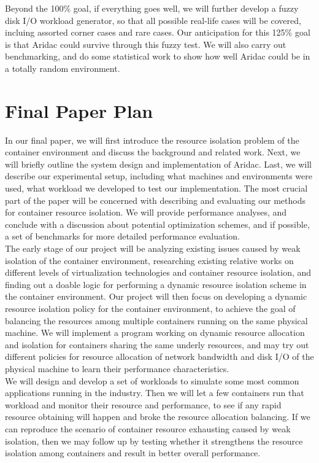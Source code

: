 \documentclass[10pt, conference,compsoc]{IEEEtran}
\begin{document}
Beyond the 100\% goal, if everything goes well, we will further develop a fuzzy disk I/O workload generator, so that all possible real-life cases will be covered, incluing assorted corner cases and rare cases. Our anticipation for this 125\% goal is that Aridac could survive through this fuzzy test. We will also carry out benchmarking, and do some statistical work to show how well Aridac could be in a totally random environment.




\section{Final Paper Plan}
In our final paper, we will first introduce the resource isolation problem of the container environment and discuss the background and related work. Next, we will briefly outline the system design and implementation of Aridac. Last, we will describe our experimental setup, including what machines and environments were used, what workload we developed to test our implementation. The most crucial part of the paper will be concerned with describing and evaluating our methods for container resource isolation. We will provide performance analyses, and conclude with a discussion about potential optimization schemes, and if possible, a set of benchmarks for more detailed performance evaluation.\\

The early stage of our project will be analyzing existing issues caused by weak isolation of the container environment, researching existing relative works on different levels of virtualization technologies and container resource isolation, and finding out a doable logic for performing a dynamic resource isolation scheme in the container environment. Our project will then focus on developing a dynamic resource isolation policy for the container environment, to achieve the goal of balancing the resources among multiple containers running on the same physical machine. We will implement a program working on dynamic resource allocation and isolation for containers sharing the same underly resources, and may try out different policies for resource allocation of network bandwidth and disk I/O of the physical machine to learn their performance characteristics.\\

We will design and develop a set of workloads to simulate some most common applications running in the industry. Then we will let a few containers run that workload and monitor their resource and performance, to see if any rapid resource obtaining will happen and broke the resource allocation balancing. If we can reproduce the scenario of container resource exhausting caused by weak isolation, then we may follow up by testing whether it strengthens the resource isolation among containers and result in better overall performance.\\
\end{document}
